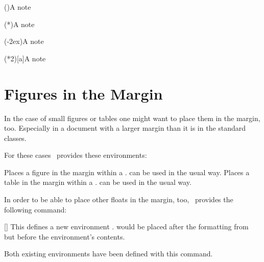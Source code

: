 \documentclass[load-preamble+]{cnltx-doc}
\begin{document}
\begin{sourcecode}
 
 
  \sidenote(){A note}
 
  \sidenote(*){A note}
 
  \sidenote(-2ex){A note}
 
  \sidenote(*2)[a]{A note}
\end{sourcecode}

\section{Figures in the Margin}\label{sec:figures-margin}
In the case of small figures or tables one might want to place them in the
margin, too.  Especially in a document with a larger margin than it is in the
standard classes.

For these cases \snotez\ provides these environments:
\begin{environments}
    Places a figure in the margin within a .   can
    be used in the usual way.
    Places a table in the margin within a .   can
    be used in the usual way.
\end{environments}

In order to be able to place other floats in the margin, too, \snotez\
provides the following command:
\begin{commands}
  []
    This defines a new environment .   would
    be placed after the formatting from \option{sidefloat-format} but before
    the environment's contents.
\end{commands}
Both existing environments have been defined with this command.
\begin{sourcecode}
\end{sourcecode}
\end{document}
